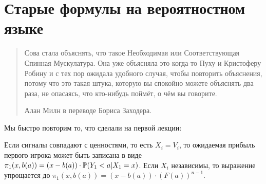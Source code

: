 \section{Старые формулы на вероятностном языке}


\begin{quotation}
Сова стала объяснять, что такое Необходимая или Соответствующая Спинная Мускулатура. Она уже объясняла это когда-то Пуху и Кристоферу Робину и с тех пор ожидала удобного случая, чтобы повторить объяснения, потому что это такая штука, которую вы спокойно можете объяснять два раза, не опасаясь, что кто-нибудь поймёт, о чём вы говорите.

Алан Милн в переводе Бориса Заходера.
\end{quotation}

Мы быстро повторим то, что сделали на первой лекции:
\begin{myth}
Если сигналы совпадают с ценностями, то есть $ X_{i}=V_{i} $, то ожидаемая прибыль первого игрока может быть записана в виде $\pi_{1}(x,b(a))=(x-b(a))\cdot \P(Y_{1}<a|X_{1}=x)$. Если $X_i$ независимы, то выражение упрощается до $\pi_{1}(x,b(a))=(x-b(a))\cdot (F(a))^{n-1}$.
\end{myth}


